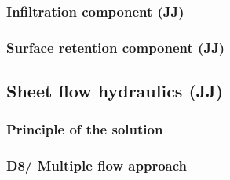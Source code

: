         \subsubsection{Infiltration component (JJ) }

 

 

        \subsubsection{Surface retention component (JJ)}
    \subsection{Sheet flow hydraulics (JJ)}
        \subsubsection{Principle of the solution}


        \subsubsection{D8/ Multiple flow approach}

 

